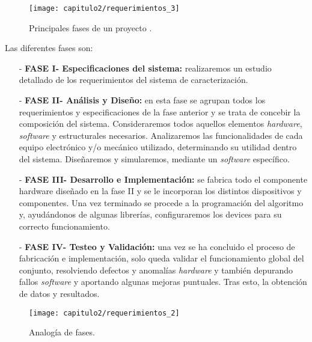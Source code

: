 \smallskip	
\begin{figure}[H]%
\noindent \begin{centering}
\texttt{[image: capitulo2/requerimientos\_3]}
\par\end{centering}
\smallskip
\caption{\label{fig:requerimientos_3} Principales fases de un proyecto \cite{WIKIPED}.}
\end{figure}


Las diferentes fases son:

\begin{enumerate}
 \item[-] \textbf{FASE I- Especificaciones del sistema:} realizaremos un estudio detallado de los requerimientos del sistema de caracterización. 

 \item[-] \textbf{FASE II- Análisis y Diseño:} en esta fase se agrupan todos los requerimientos y especificaciones de la fase anterior y se trata de concebir la composición del sistema. Consideraremos todos aquellos elementos \textit{hardware}, \textit{software} y estructurales necesarios. Analizaremos las funcionalidades de cada equipo electrónico y/o mecánico utilizado, determinando su utilidad dentro del sistema. Diseñaremos y simularemos, mediante un \textit{software} específico.

 \item[-] \textbf{FASE III- Desarrollo e Implementación:} se fabrica todo el componente hardware diseñado en la fase II y se le incorporan los distintos dispositivos y componentes. Una vez terminado se procede a la programación del algoritmo  y, ayudándonos de algunas librerías, configuraremos los devices para su correcto funcionamiento. 

 \item[-] \textbf{FASE IV- Testeo y Validación:} una vez se ha concluido el proceso de fabricación e implementación, solo queda validar el funcionamiento global del conjunto, resolviendo defectos y anomalías \textit{hardware} y también depurando fallos \textit{software} y aportando algunas mejoras puntuales. Tras esto, la obtención de datos y resultados.
\end{enumerate}


\smallskip	
\begin{figure}[H]%
\noindent \begin{centering}
\texttt{[image: capitulo2/requerimientos\_2]}
\par\end{centering}
\smallskip
\caption{\label{fig:fases_proy_step} Analogía de fases.}
\end{figure}


\clearpage{\cleardoublepage}
\clearpage{\pagestyle{empty}\cleardoublepage}

